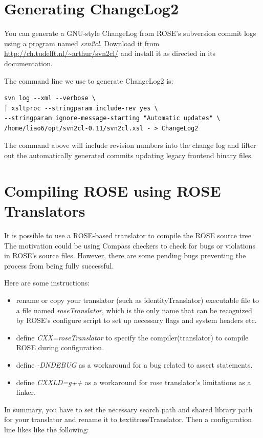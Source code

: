 \section{Generating ChangeLog2}%

You can generate a GNU-style ChangeLog from ROSE's subversion commit logs using a program named \textit{svn2cl}. 
Download it from \url{http://ch.tudelft.nl/~arthur/svn2cl/}
and install it as directed in its documentation. 

The command line we use to generate ChangeLog2 is:
\begin{verbatim}
svn log --xml --verbose \
| xsltproc --stringparam include-rev yes \
--stringparam ignore-message-starting "Automatic updates" \
/home/liao6/opt/svn2cl-0.11/svn2cl.xsl - > ChangeLog2
\end{verbatim}
The command above will include revision numbers into the change log and
filter out the automatically generated commits updating legacy frontend binary files.


\section{Compiling ROSE using ROSE Translators}%
It is possible to use a ROSE-based translator to compile the ROSE source
tree.
The motivation could be using Compass checkers to check for bugs or
violations in ROSE's source files. 
However, there are some pending bugs preventing the process from being fully successful.  

Here are some instructions:
\begin{itemize}
\item rename or copy your translator (such as identityTranslator) executable file to a file named
\textit{roseTranslator}, which is the only name that can be recognized by
ROSE's configure script to set up necessary flags and system headers etc. 
\item define \textit{CXX=roseTranslator} to specify the
compiler(translator) to compile ROSE during configuration.
\item define \textit{-DNDEBUG} as a workaround for a bug related to assert
statements.
\item define \textit{CXXLD=g++} as a workaround for rose translator's
limitations as a linker.
\end{itemize}
In summary, you have to set the necessary search path and shared library
path for your translator and rename it to textit{roseTranslator}.
Then a configuration line likes like the following:

